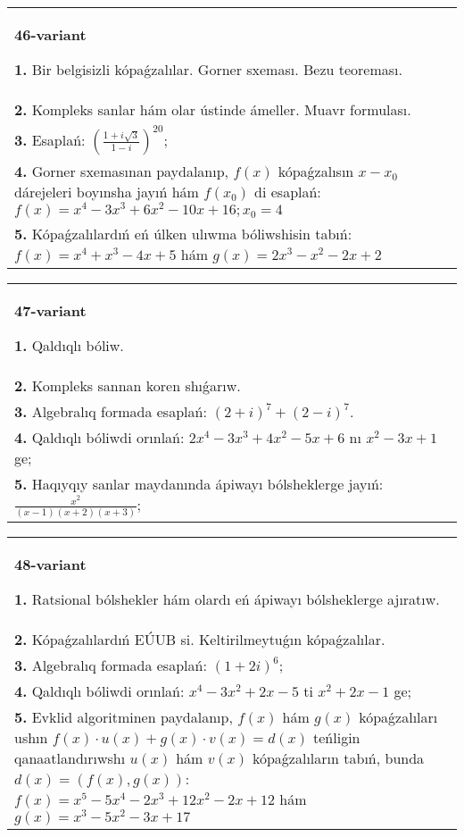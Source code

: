 \documentclass{article}
\begin{document}
\begin{tabular}{m{17cm}}
\textbf{46-variant}
\newline

\textbf{1.} Bir belgisizli kópaǵzalılar. Gorner sxeması. Bezu teoreması.  \\
\textbf{2.} Kompleks sanlar hám olar ústinde ámeller. Muavr formulası.  \\
\textbf{3.} Esaplań:  $\left(\frac{1+i \sqrt{3}}{1-i}\right)^{20}$; \\
\textbf{4.} Gorner sxemasınan paydalanıp, $f(x)$ kópaǵzalısın $x-x_0$ dárejeleri boyınsha jayıń hám $f\left(x_0\right)$ di esaplań: $f(x)=x^4-3 x^3+6 x^2-10 x+16 ; x_0=4$ \\
\textbf{5.} Kópaǵzalılardıń eń úlken ulıwma bóliwshisin tabıń:  $f(x)=x^4+x^3-4 x+5$ hám $g(x)=2 x^3-x^2-2 x+2$ \\

\end{tabular}
\vspace{1cm}


\begin{tabular}{m{17cm}}
\textbf{47-variant}
\newline

\textbf{1.} Qaldıqlı bóliw.  \\
\textbf{2.} Kompleks sannan koren shıǵarıw. \\
\textbf{3.} Algebralıq formada esaplań: $(2+i)^7+(2-i)^7$. \\
\textbf{4.} Qaldıqlı bóliwdi orınlań: $2 x^4-3 x^3+4 x^2-5 x+6$ nı $x^2-3 x+1$ ge; \\
\textbf{5.} Haqıyqıy sanlar maydanında ápiwayı bólsheklerge jayıń:  $\frac{x^2}{(x-1)(x+2)(x+3)}$; \\

\end{tabular}
\vspace{1cm}


\begin{tabular}{m{17cm}}
\textbf{48-variant}
\newline

\textbf{1.} Ratsional bólshekler hám olardı eń ápiwayı bólsheklerge ajıratıw. \\
\textbf{2.} Kópaǵzalılardıń EÚUB si. Keltirilmeytuǵın   kópaǵzalılar. \\
\textbf{3.} Algebralıq formada esaplań: $(1+2 i)^6$; \\
\textbf{4.} Qaldıqlı bóliwdi orınlań: $x^4-3 x^2+2 x-5$ ti $x^2+2 x-1$ ge; \\
\textbf{5.} Evklid algoritminen paydalanıp, $f(x)$ hám $g(x)$ kópaǵzalıları ushın $f(x) \cdot u(x)+g(x) \cdot v(x)=d(x)$ teńligin qanaatlandırıwshı $u(x)$ hám $v(x)$ kópaǵzalıların tabıń, bunda $d(x)=(f(x), g(x))$:  $f(x)=x^5-5 x^4-2 x^3+12 x^2-2 x+12$ hám $g(x)=x^3-5 x^2-3 x+17$ \\

\end{tabular}
\vspace{1cm}
\end{document}
